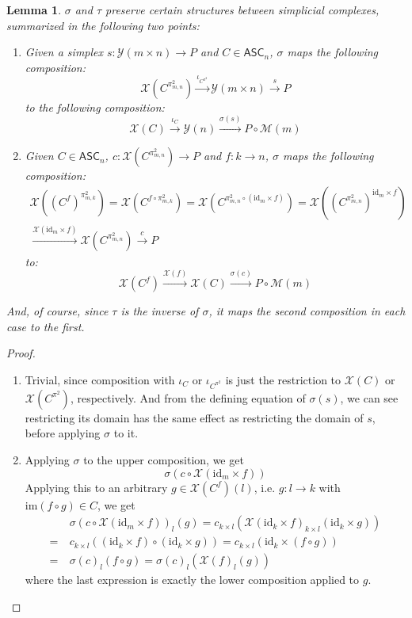 \documentclass{article}
\newtheorem{lemma}{Lemma}[subsection]
\theoremstyle{remark}
\theoremstyle{definition}
\newcommand{\ASC}{\mathsf{ASC}}
\newcommand{\im}{\mathrm{im}}
\newcommand{\id}{\mathrm{id}}
\newcommand{\Y}{\mathcal Y}
\newcommand{\X}{\mathcal X}
\newcommand{\M}{\mathcal M}
\begin{document}
	\begin{lemma}\label{sigstruct}
		$\sigma$ and $\tau$ preserve certain structures between simplicial complexes, summarized in the following two points:
		\begin{enumerate}
			\item Given a simplex $s:\Y(m\times n)\to P$ and $C\in\ASC_n$, $\sigma$ maps the following composition:
			\[\X(C^{\pi^2_{m,n}})\xrightarrow{\iota_{C^{\pi^2}}}\Y(m\times n)\xrightarrow{s}P\]
			to the following composition:
			\[\X(C)\xrightarrow{\iota_C}\Y(n)\xrightarrow{\sigma(s)}P\circ\M(m)\]
			\item Given $C\in\ASC_n$, $c:\X(C^{\pi^2_{m,n}})\to P$ and $f:k\to n$, $\sigma$ maps the following composition:
			\begin{align*}
				\X((C^f)^{\pi^2_{m,k}})=\X(C^{f\circ\pi^2_{m,k}})=\X(C^{\pi^2_{m,n}\circ(\id_m\times f)})=\X((C^{\pi^2_{m,n}})^{\id_m\times f})\\
				\xrightarrow{\X(\id_m\times f)}\X(C^{\pi^2_{m,n}})\xrightarrow{c}P
			\end{align*}
			to:
			\[\X(C^f)\xrightarrow{\X(f)}\X(C)\xrightarrow{\sigma(c)}P\circ\M(m)\]
			\begin{comment}
				\item Given $s:\Y(m\times n)\to P$ and $f:k\to n$, $\sigma$ maps the following:
				\[\Y(m\times k)\xrightarrow{\Y(\id_m\times f)}\Y(m\times n)\xrightarrow{s}P\]
				to:
				\[\Y(k)\xrightarrow{\Y(f)}\Y(n)\xrightarrow{\sigma(s)}P\circ\M(m)\]
			\end{comment}
		\end{enumerate}
		And, of course, since $\tau$ is the inverse of $\sigma$, it maps the second composition in each case to the first.
	\end{lemma}
	\begin{proof}
		\begin{enumerate}
			\item Trivial, since composition with $\iota_C$ or $\iota_{C^{\pi^2}}$ is just the restriction to $\X(C)$ or $\X(C^{\pi^2})$, respectively. And from the defining equation of $\sigma(s)$, we can see restricting its domain has the same effect as restricting the domain of $s$, before applying $\sigma$ to it.
			\item Applying $\sigma$ to the upper composition, we get
			\[\sigma(c\circ\X(\id_m\times f))\]
			Applying this to an arbitrary $g\in\X(C^f)(l)$, i.e. $g:l\to k$ with $\im(f\circ g)\in C$, we get
			\begin{align*}
				&\sigma(c\circ\X(\id_m\times f))_l(g)=c_{k\times l}(\X(\id_k\times f)_{k\times l}(\id_k\times g))\\
				=\ &c_{k\times l}((\id_k\times f)\circ(\id_k\times g))=c_{k\times l}(\id_k\times(f\circ g))\\
				=\ &\sigma(c)_l(f\circ g)=\sigma(c)_l(\X(f)_l(g))
			\end{align*}
			where the last expression is exactly the lower composition applied to $g$.
		\end{enumerate}
	\end{proof}
\end{document}
